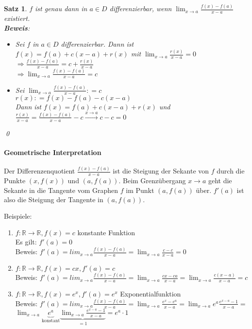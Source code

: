 \documentclass[ngerman,titlepage,twoside, parskip=half*]{scrreprt}
\newcommand*{\R}{\mathbb{R}}
\theoremstyle{plain}
\newtheorem{theorem}{Satz}[section]
\theoremstyle{definition}
\theoremstyle{remark}
\newcommand*{\coloneqq}{\mathrel{\mathop:}=}
\begin{document}
\begin{theorem}
$f$ ist genau dann in $a\in D$ differenzierbar, wenn $\lim_{x\rightarrow a} \frac{f(x)-f(a)}{x-a}$
existiert.\\
\textbf{Beweis}:
\begin{itemize}
  \item["`$\Rightarrow$"'] Sei $f$ in $a\in D$ differenzierbar. Dann ist $f(x)=f(a)+c(x-a)+r(x)$ mit
    $\lim_{x\rightarrow a}\frac{r(x)}{x-a}=0$\\
    $\Rightarrow \frac{f(x)-f(a)}{x-a}=c+\frac{r(x)}{x-a}$\\
    $\Rightarrow \lim_{x\rightarrow a} \frac{f(x)-f(a)}{x-a}=c$
  \item["`$\Leftarrow$"'] Sei $\lim_{x\rightarrow a}
  \frac{f(x)-f(a)}{x-a}\coloneqq c$\\
    $r(x)\coloneqq f(x)-f(a)-c(x-a)$\\
    Dann ist $f(x)=f(a)+c(x-a)+r(x)$ und $\frac{r(x)}{x-a}=
    \frac{f(x)-f(a)}{x-a}-c\stackrel{x\rightarrow a}{\rightarrow}c-c=0$
\end{itemize}
\qed
\end{theorem}

\paragraph{Geometrische Interpretation}
Der Differenzenquotient
$\frac{f(x)-f(a)}{x-a}$ ist die Steigung der Sekante
 von $f$ durch die Punkte $(x,f(x))$ und
$(a,f(a))$. Beim Grenzübergang $x\rightarrow a$ geht die Sekante in
die Tangente vom Graphen $f$ im Punkt $(a,f(a))$
über. $f'(a)$ ist also die Steigung der Tangente in $(a,f(a))$.

Beispiele:
\begin{enumerate}[(1)]
\item $f\colon\R\rightarrow\R, f(x)=c$ konstante Funktion\\
  Es gilt: $f'(a)=0$\\
  Beweis: $f'(a)=lim_{x\rightarrow
    a}\frac{f(x)-f(a)}{x-a}=\lim_{x\rightarrow a}\frac{c-c}{x-a}=0$
\item $f\colon\R\rightarrow\R, f(x)=cx, f'(a)=c$\\
  Beweis: $f'(a)=lim_{x\rightarrow
    a}\frac{f(x)-f(a)}{x-a}=\lim_{x\rightarrow a}\frac{cx-ca}{x-a}
  =\lim_{x\rightarrow a}\frac{c(x-a)}{x-a}=c$
\item $f\colon\R\rightarrow\R, f(x)=e^x, f'(a)=e^x$ Exponentialfunktion\\
  Beweis: $f'(a)=lim_{x\rightarrow
    a}\frac{f(x)-f(a)}{x-a}=\lim_{x\rightarrow a}\frac{e^x-e^a}{x-a}=
  \lim_{x\rightarrow a}e^a\frac{e^{x-a}-1}{x-a}=$\\
  $\lim_{x\rightarrow a}\underbrace{e^a}_{\text{konstant}}
  \underbrace{\lim_{x\rightarrow
      a}\frac{e^{x-a}-1}{x-a}}_{=1}=e^a\cdot 1$
 \end{enumerate}
\end{document}
